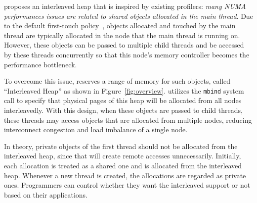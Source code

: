 \NA{} proposes an interleaved heap that is inspired by existing profilers\cite{XuNuma, MemProf}: \textit{many NUMA performances issues are related to shared objects allocated in the main thread}. Due to the default first-touch policy~\cite{lameter2013numa, diener2015locality}, objects allocated and touched by the main thread are typically allocated in the node that the main thread is running on. However, these objects can be passed to multiple child threads and be accessed by these threads concurrently so that this node's memory controller becomes the performance bottleneck. 

To overcome this issue, \NA{} reserves a range of memory for such objects, called ``Interleaved Heap'' as shown in Figure~\ref{fig:overview}. \NA{} utilizes the \texttt{mbind} system call to specify that physical pages of this heap will be allocated from all nodes interleavedly. With this design, when these objects are passed to child threads, these threads may access objects that are allocated from multiple nodes, reducing interconnect congestion and load imbalance of a single node. 

In theory, private objects of the first thread should not be allocated from the interleaved heap, since that will create remote accesses unnecessarily. Initially, each allocation is treated as a shared one and is allocated from the interleaved heap. Whenever a new thread is created, the allocations are regarded as private ones. Programmers can control whether they want the interleaved support or not based on their applications.




